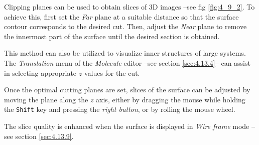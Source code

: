 \documentclass[10pt]{article}
\begin{document}
Clipping planes can be used to obtain slices of 3D images --see fig 
\ref{fig:4_9_2}. To achieve this, first set the {\it Far} plane at a 
suitable distance so that 
the surface contour corresponds to the desired cut. Then, adjust the {\it Near} plane 
to remove the innermost part of the surface 
until the desired section is obtained.  

This method can also be utilized to visualize inner structures of 
large systems.  
The {\it Translation} menu of the {\it Molecule} editor --see section \ref{sec:4.13.4}--  
can assist in selecting appropriate $z$ values for the cut.  

Once the optimal cutting planes are set, slices of the surface can be  
adjusted by moving the plane along the $z$ axis, either by dragging the mouse  
while holding the \texttt{Shift} key and pressing the {\it right button}, or by rolling  
the mouse wheel.  

The slice quality is enhanced when the surface is displayed in {\it Wire frame} mode --see section \ref{sec:4.13.9}.  
\end{document}
